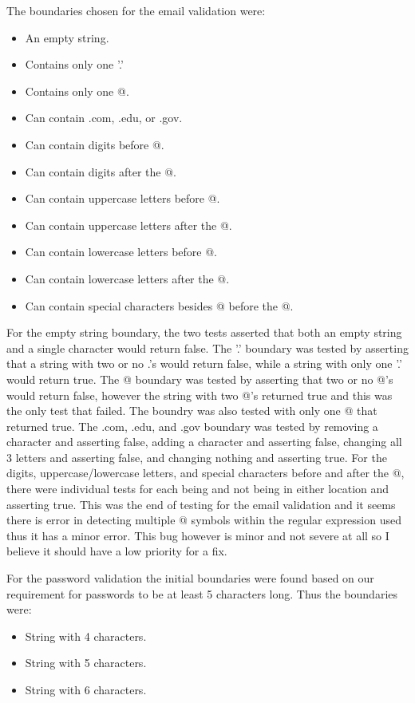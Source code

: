 \documentclass[a4paper]{article}
\begin{document}
The boundaries chosen for the email validation were:

\begin{itemize}
   \item An empty string.
   \item Contains only one '.'
   \item Contains only one @.
   \item Can contain .com, .edu, or .gov.
   \item Can contain digits before @.
   \item Can contain digits after the @.
   \item Can contain uppercase letters before @.
   \item Can contain uppercase letters after the @.
   \item Can contain lowercase letters before @.
   \item Can contain lowercase letters after the @.
   \item Can contain special characters besides @ before the @.
\end{itemize}

For the empty string boundary, the two tests asserted that both an empty string and a single character would return false.
The '.' boundary was tested by asserting that a string with two or no .'s would return false, while a string with only one '.' would return true.
The @ boundary was tested by asserting that two or no @'s would return false, however the string with two @'s returned true and this was the only test that failed.
The boundry was also tested with only one @ that returned true.
The .com, .edu, and .gov boundary was tested by removing a character and asserting false, adding a character and asserting false, changing all 3 letters and asserting false, and changing nothing and asserting true.
For the digits, uppercase/lowercase letters, and special characters before and after the @, there were individual tests for each being and not being in either location and asserting true.
This was the end of testing for the email validation and it seems there is error in detecting multiple @ symbols within the regular expression used thus it has a minor error.
This bug however is minor and not severe at all so I believe it should have a low priority for a fix.

For the password validation the initial boundaries were found based on our requirement for passwords to be at least 5 characters long.
Thus the boundaries were:

\begin{itemize}
   \item String with 4 characters.
   \item String with 5 characters.
   \item String with 6 characters.
\end{itemize}
\end{document}
